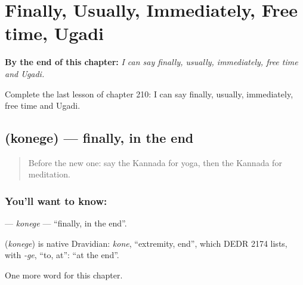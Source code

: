 
\chapter{Finally, Usually, Immediately, Free time, Ugadi}
\label{ch:ka-finally-usually-immediately-free-time-ugadi}

\begin{chapteropening}
\textbf{By the end of this chapter:} \emph{I can say finally, usually, immediately, free time and Ugadi.}

Complete the last lesson of chapter 210: I can say finally, usually, immediately, free time and Ugadi.
\end{chapteropening}

\section[\texorpdfstring{\kn{ಕೊನೆಗೆ} (konege)}{ಕೊನೆಗೆ (konege)}]{ (konege) — finally, in the end}

\label{lesson:KA-C210-konege}



\begin{quote}
Before the new one: say the Kannada for yoga, then the Kannada for meditation.
\end{quote}

\subsection*{You'll want to know: }
\textbf{} — \emph{konege} — \textquotedblleft{}finally, in the end\textquotedblright{}.

\begin{cousinweb}
\textbf{} (\emph{konege}) is native Dravidian: \emph{kone}, \textquotedblleft{}extremity, end\textquotedblright{}, which DEDR 2174 lists, with \emph{-ge}, \textquotedblleft{}to, at\textquotedblright{}: \textquotedblleft{}at the end\textquotedblright{}.
\end{cousinweb}

\begin{grammarlens}[title={What you've built}]
One more word for this chapter.
\end{grammarlens}

